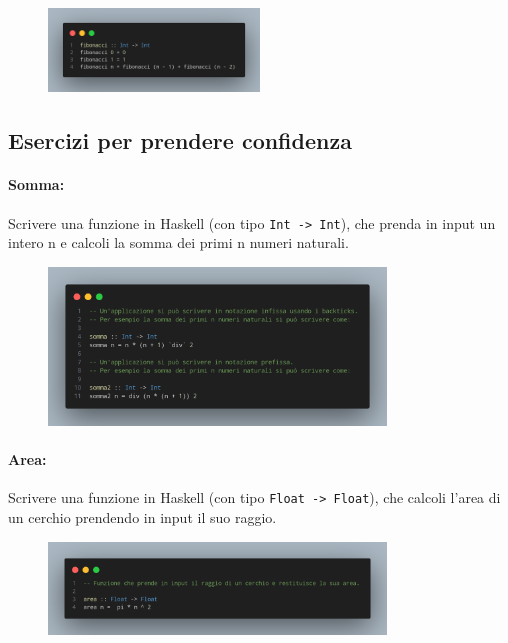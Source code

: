 \begin{figure}[!h]
    \centering
    \includegraphics[width=0.5\textwidth]{images/Fibonacci.png}
\end{figure}

\subsection{Esercizi per prendere confidenza}

\paragraph{Somma:} Scrivere una funzione in Haskell (con tipo \texttt{Int -> Int}), 
che prenda in input un intero n e calcoli la somma dei primi n numeri naturali.

\begin{figure}[!h]
    \centering
    \includegraphics[width=0.8\textwidth]{images/Somma.png}
\end{figure}

\paragraph{Area:} Scrivere una funzione in Haskell (con tipo \texttt{Float -> Float}), 
che calcoli l'area di un cerchio prendendo in input il suo raggio.

\begin{figure}[!h]
    \centering
    \includegraphics[width=0.8\textwidth]{images/Area.png}
\end{figure}
\pagebreak
